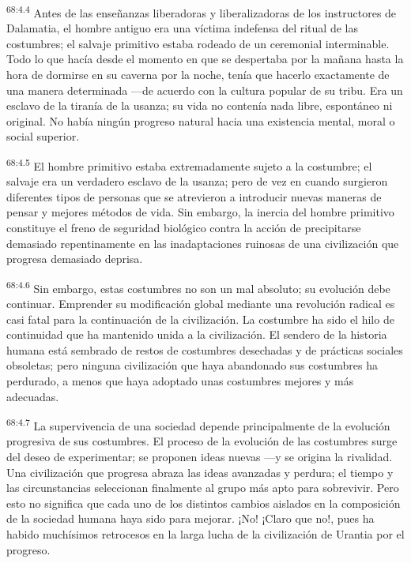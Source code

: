 \par
\textsuperscript{68:4.4} Antes de las enseñanzas liberadoras y liberalizadoras de los instructores de Dalamatia, el hombre antiguo era una víctima indefensa del ritual de las costumbres; el salvaje primitivo estaba rodeado de un ceremonial interminable. Todo lo que hacía desde el momento en que se despertaba por la mañana hasta la hora de dormirse en su caverna por la noche, tenía que hacerlo exactamente de una manera determinada ---de acuerdo con la cultura popular de su tribu. Era un esclavo de la tiranía de la usanza; su vida no contenía nada libre, espontáneo ni original. No había ningún progreso natural hacia una existencia mental, moral o social superior.

\par
\textsuperscript{68:4.5} El hombre primitivo estaba extremadamente sujeto a la costumbre; el salvaje era un verdadero esclavo de la usanza; pero de vez en cuando surgieron diferentes tipos de personas que se atrevieron a introducir nuevas maneras de pensar y mejores métodos de vida. Sin embargo, la inercia del hombre primitivo constituye el freno de seguridad biológico contra la acción de precipitarse demasiado repentinamente en las inadaptaciones ruinosas de una civilización que progresa demasiado deprisa.

\par
\textsuperscript{68:4.6} Sin embargo, estas costumbres no son un mal absoluto; su evolución debe continuar. Emprender su modificación global mediante una revolución radical es casi fatal para la continuación de la civilización. La costumbre ha sido el hilo de continuidad que ha mantenido unida a la civilización. El sendero de la historia humana está sembrado de restos de costumbres desechadas y de prácticas sociales obsoletas; pero ninguna civilización que haya abandonado sus costumbres ha perdurado, a menos que haya adoptado unas costumbres mejores y más adecuadas.

\par
\textsuperscript{68:4.7} La supervivencia de una sociedad depende principalmente de la evolución progresiva de sus costumbres. El proceso de la evolución de las costumbres surge del deseo de experimentar; se proponen ideas nuevas ---y se origina la rivalidad. Una civilización que progresa abraza las ideas avanzadas y perdura; el tiempo y las circunstancias seleccionan finalmente al grupo más apto para sobrevivir. Pero esto no significa que cada uno de los distintos cambios aislados en la composición de la sociedad humana haya sido para mejorar. ¡No! ¡Claro que no!, pues ha habido muchísimos retrocesos en la larga lucha de la civilización de Urantia por el progreso.

